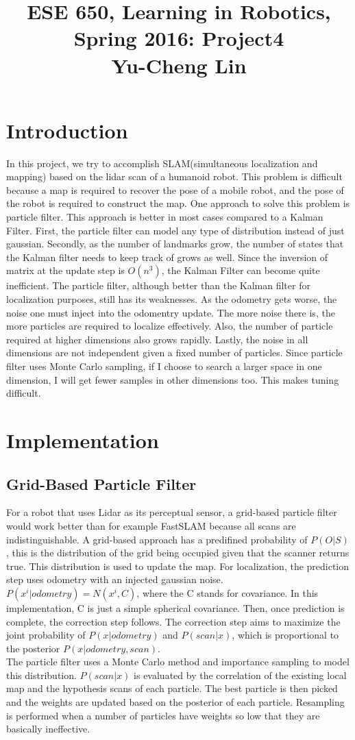 \documentclass[english]{article}
\title{ESE 650, Learning in Robotics, Spring 2016: Project4 \\
Yu-Cheng Lin}
\date{}
\begin{document}
\maketitle
\section*{Introduction}
In this project, we try to accomplish SLAM(simultaneous localization and mapping) based on the lidar scan of a humanoid robot. This problem is difficult because a map is required to recover the pose of a mobile robot, and the pose of the robot is required to construct the map. One approach to solve this problem is particle filter. This approach is better in most cases compared to a Kalman Filter. First, the particle filter can model any type of distribution instead of just gaussian. Secondly, as the number of landmarks grow, the number of states that the Kalman filter needs to keep track of grows as well. Since the inversion of matrix at the update step is $O(n^3)$, the Kalman Filter can become quite inefficient. The particle filter, although better than the Kalman filter for localization purposes, still has its weaknesses. As the odometry gets worse, the noise one must inject into the odomentry update. The more noise there is, the more particles are required to localize effectively. Also, the number of particle required at higher dimensions also grows rapidly. Lastly, the noise in all dimensions are not independent given a fixed number of particles. Since particle filter uses Monte Carlo sampling, if I choose to search a larger space in one dimension, I will get fewer samples in other dimensions too. This makes tuning difficult.
\section*{Implementation}
\subsection*{Grid-Based Particle Filter}
For a robot that uses Lidar as its perceptual sensor, a grid-based particle filter would work better than for example FastSLAM because all scans are indistinguishable. A grid-based approach has a predifined probability of $P(O|S)$, this is the distribution of the grid being occupied given that the scanner returns true. This distribution is used to update the map. For localization, the prediction step uses odometry with an injected gaussian noise. $P(x^{i}|odometry) = N(x^{i}, C)$, where the C stands for covariance. In this implementation, C is just a simple spherical covariance. Then, once prediction is complete, the correction step follows. The correction step aims to maximize the joint probability of $P(x|odometry)$ and $P(scan|x)$, which is proportional to the posterior $P(x|odometry, scan)$.\\
The particle filter uses a Monte Carlo method and importance sampling to model this distribution. $P(scan|x)$ is evaluated by the correlation of the existing local map and the hypothesis scans of each particle. The best particle is then picked and the weights are updated based on the posterior of each particle. Resampling is performed when a number of particles have weights so low that they are basically ineffective.
\end{document}
